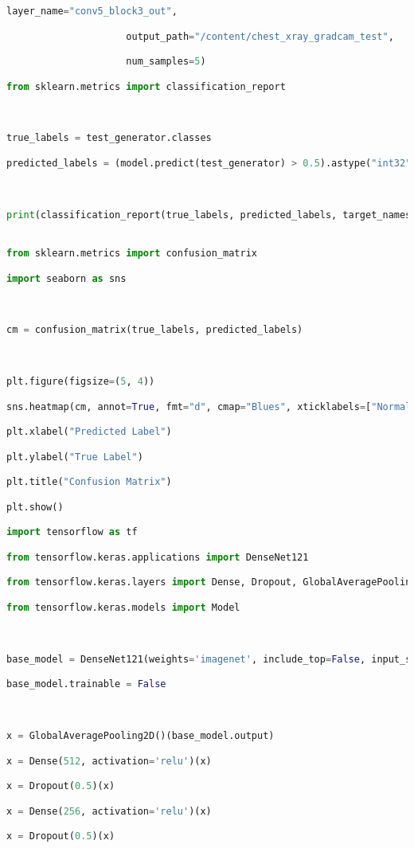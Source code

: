 \documentclass{article}
\begin{document}
\begin{lstlisting}[style=mystyle,language=Python]
                     layer_name="conv5_block3_out",

                     output_path="/content/chest_xray_gradcam_test",

                     num_samples=5)

from sklearn.metrics import classification_report



true_labels = test_generator.classes

predicted_labels = (model.predict(test_generator) > 0.5).astype("int32")



print(classification_report(true_labels, predicted_labels, target_names=["Normal", "Pneumonia"]))


from sklearn.metrics import confusion_matrix

import seaborn as sns



cm = confusion_matrix(true_labels, predicted_labels)



plt.figure(figsize=(5, 4))

sns.heatmap(cm, annot=True, fmt="d", cmap="Blues", xticklabels=["Normal", "Pneumonia"], yticklabels=["Normal", "Pneumonia"])

plt.xlabel("Predicted Label")

plt.ylabel("True Label")

plt.title("Confusion Matrix")

plt.show()

import tensorflow as tf

from tensorflow.keras.applications import DenseNet121

from tensorflow.keras.layers import Dense, Dropout, GlobalAveragePooling2D

from tensorflow.keras.models import Model



base_model = DenseNet121(weights='imagenet', include_top=False, input_shape=(256, 256, 3))

base_model.trainable = False



x = GlobalAveragePooling2D()(base_model.output)

x = Dense(512, activation='relu')(x)

x = Dropout(0.5)(x)

x = Dense(256, activation='relu')(x)

x = Dropout(0.5)(x)


\end{lstlisting}
\end{document}
